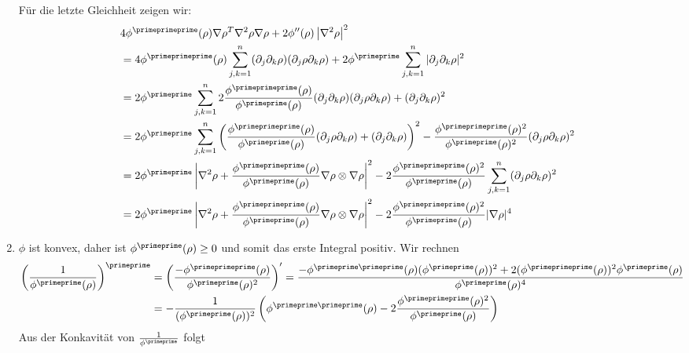 \begin{solution}
\begin{enumerate}[label = (\roman*)]
  Für die letzte Gleichheit zeigen wir:
  \begin{align*}
  &4\phi^{\primeprimeprime}(\rho) \nabla \rho^{T} \nabla^{2} \rho \nabla \rho+2
  \phi^{\prime \prime}(\rho)\left|\nabla^{2} \rho\right|^{2} \\
  &= 4\phi^{\primeprimeprime}(\rho)\sum_{j,k=1}^n(\partial_j\partial_k\rho)(\partial_j\rho\partial_k\rho) +
  2\phi^{\primeprime}\sum_{j,k=1}^n |\partial_j\partial_k\rho|^2 \\
  &= 2\phi^{\primeprime}\sum_{j,k=1}^n 2\frac{\phi^{\primeprimeprime}(\rho)}{\phi^{\primeprime}(\rho)}
  (\partial_j\partial_k\rho)(\partial_j\rho\partial_k\rho)+(\partial_j\partial_k\rho)^2 \\
  &= 2\phi^{\primeprime}\sum_{j,k=1}^n \left(\frac{\phi^{\primeprimeprime}(\rho)}{\phi^{\primeprime}(\rho)}
  (\partial_j\rho\partial_k\rho)+(\partial_j\partial_k\rho)\right)^2 - \frac{\phi^{\primeprimeprime}(\rho)^2}{\phi^{\primeprime}(\rho)^2}
  (\partial_j\rho\partial_k\rho)^2\\
  &= 2\phi^{\primeprime}\left|\nabla^2\rho +
  \frac{\phi^{\primeprimeprime}(\rho)}{\phi^{\primeprime}(\rho)} \nabla\rho \otimes
  \nabla \rho \right|^2 -
   2\frac{\phi^{\primeprimeprime}(\rho)^2}{\phi^{\primeprime}(\rho)}
  \sum_{j,k=1}^n(\partial_j\rho\partial_k\rho)^2\\
  &= 2\phi^{\primeprime}\left|\nabla^2\rho +
  \frac{\phi^{\primeprimeprime}(\rho)}{\phi^{\primeprime}(\rho)} \nabla\rho \otimes
  \nabla \rho \right|^2 -
   2\frac{\phi^{\primeprimeprime}(\rho)^2}{\phi^{\primeprime}(\rho)}
  |\nabla\rho|^4\\
  \end{align*}
  \item $\phi$ ist konvex, daher ist $\phi^{\primeprime}(\rho) \geq 0$ und
  somit das erste Integral positiv. Wir rechnen
  \begin{align*}
  \left(\frac{1}{\phi^{\primeprime}(\rho)}\right)^{\primeprime} &=
  \left(\frac{-\phi^{\primeprimeprime}(\rho)}{\phi^{\primeprime}(\rho)^2}\right)^{\prime} =
  \frac{-\phi^{\primeprime\primeprime}(\rho)(\phi^{\primeprime}(\rho))^2 +
  2(\phi^{\primeprimeprime}(\rho))^2\phi^{\primeprime}(\rho)}{\phi^{\primeprime}(\rho)^4} \\
  &= -\frac{1}{(\phi^{\primeprime}(\rho))^2}
  \left(\phi^{\primeprime\primeprime}(\rho) -
  2\frac{\phi^{\primeprimeprime}(\rho)^2}{\phi^{\primeprime}(\rho)}\right)
  \end{align*}
  Aus der Konkavität von $\frac{1}{\phi^{\primeprime}}$ folgt
  \begin{align*}

\end{align*}
\end{enumerate}
\end{solution}
